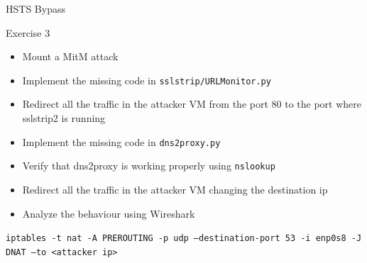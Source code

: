 \documentclass{beamer}
\begin{document}
\begin{frame}{HSTS Bypass}
  \begin{block}{Exercise 3}
  \begin{itemize}
      \item Mount a MitM attack
      \item Implement the missing code in \texttt{sslstrip/URLMonitor.py}
      \item Redirect all the traffic in the attacker VM from the port 80 to the port where sslstrip2 is running
      \item Implement the missing code in \texttt{dns2proxy.py}
      \item Verify that dns2proxy is working properly using \texttt{nslookup}
      \item Redirect all the traffic in the attacker VM changing the destination ip
      \item Analyze the behaviour using Wireshark
  \end{itemize}
  \end{block}
  \pause
  \texttt{iptables -t nat -A PREROUTING -p udp --destination-port 53 -i enp0s8 -J DNAT --to <attacker ip>}
\end{frame}
\end{document}
